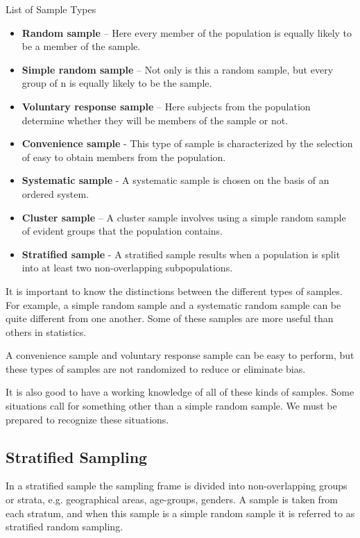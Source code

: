 ﻿\documentclass[]{report}
\begin{document}
\begin{framed}
List of Sample Types

\begin{itemize}
\item \textbf{Random sample} – Here every member of the population is equally likely to be a member of the sample.
\item \textbf{Simple random sample} – Not only is this a random sample, but every group of n is equally likely to be the sample.
\item \textbf{Voluntary response sample} – Here subjects from the population determine whether they will be members of the sample or not.
\item \textbf{Convenience sample} - This type of sample is characterized by the selection of easy to obtain members from the population.
\item \textbf{Systematic sample} - A systematic sample is chosen on the basis of an ordered system.
\item \textbf{Cluster sample} – A cluster sample involves using a simple random sample of evident groups that the population contains.
\item \textbf{Stratified sample} - A stratified sample results when a population is split into at least two non-overlapping subpopulations.
\end{itemize}
\end{framed}

It is important to know the distinctions between the different types of samples. For example, a simple random sample and a systematic random sample can be quite different from one another. Some of these samples are more useful than others in statistics. 

A convenience sample and voluntary response sample can be easy to perform, but these types of samples are not randomized to reduce or eliminate bias.

It is also good to have a working knowledge of all of these kinds of samples. Some situations call for something other than a simple random sample. We must be prepared to recognize these situations.





\subsection{Stratified Sampling}

In a stratified sample the sampling frame is divided into
non-overlapping groups or strata, e.g. geographical areas,
age-groups, genders.  A sample is taken from each stratum, and
when this sample is a simple random sample it is referred to as
stratified random sampling.
\end{document}
